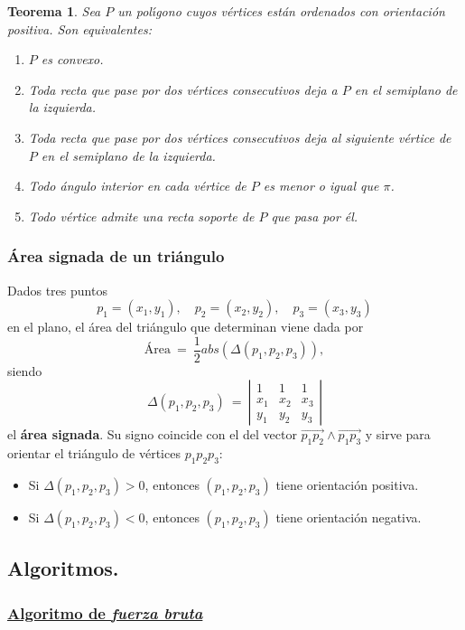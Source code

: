 \documentclass[ebook,oneside]{memoir}
\newtheorem{thm}{Teorema}[chapter]
\begin{document}
\begin{thm} Sea $P$ un pol\'{\i}gono cuyos v\'{e}rtices est\'{a}n
ordenados con orientaci\'{o}n positiva. Son equivalentes:
\begin{enumerate}
  \item $P$ es convexo.
  \item Toda recta que pase por dos v\'{e}rtices consecutivos deja a $P$
en el semiplano de la izquierda.
  \item Toda recta que pase por dos v\'{e}rtices consecutivos deja al
siguiente v\'{e}rtice de $P$ en el semiplano de la izquierda.
  \item Todo \'{a}ngulo interior en cada v\'{e}rtice de $P$ es menor o igual
que $\pi$.
  \item Todo v\'{e}rtice admite una recta soporte de $P$ que pasa por
\'{e}l.
\end{enumerate}
\end{thm}


\subsubsection{\'Area signada de un tri\'angulo}

\noindent Dados tres puntos $$p_1=(x_1,y_1), \quad p_2=(x_2,y_2), \quad p_3=(x_3,y_3)$$ en el plano, el \'area del tri\'angulo que determinan viene dada por
$$\mbox{\'Area} \ = \ \frac{1}{2} { abs}\left(\Delta(p_1,p_2,p_3)\right),$$
siendo $$\Delta(p_1,p_2,p_3) \ = \ \left| \begin{array}{ccc}
1 & 1 & 1 \\
x_1 & x_2 & x_3 \\
y_1 & y_2 & y_3
\end{array}
\right|$$
el \textbf{\'area signada}. Su signo coincide con el del vector $\overrightarrow{p_1p_2}\wedge\overrightarrow{p_1p_3}$ y sirve para orientar el tri\'angulo
de v\'ertices $p_1p_2p_3$:
\begin{itemize}
   \item Si $\Delta(p_1,p_2,p_3)>0$, entonces $(p_1,p_2,p_3)$ tiene orientaci\'on positiva.
   \item Si $\Delta(p_1,p_2,p_3)<0$, entonces $(p_1,p_2,p_3)$ tiene orientaci\'on negativa.
\end{itemize}

\subsection{Algoritmos.}

\subsubsection{\underline{Algoritmo de {\textit \textbf{fuerza bruta}}}}
\end{document}
